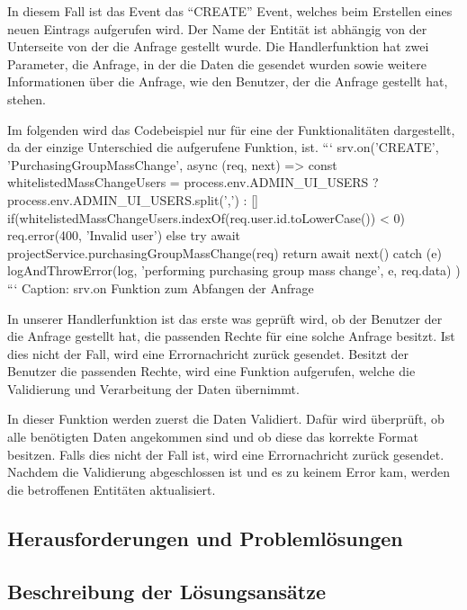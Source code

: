 In diesem Fall ist das Event das “CREATE” Event, welches beim Erstellen eines neuen Eintrags aufgerufen wird. Der Name der Entität ist abhängig von der Unterseite von der die Anfrage gestellt wurde. Die Handlerfunktion hat zwei Parameter, die Anfrage, in der die Daten die gesendet wurden sowie weitere Informationen über die Anfrage, wie den Benutzer, der die Anfrage gestellt hat, stehen.

Im folgenden wird das Codebeispiel nur für eine der Funktionalitäten dargestellt, da der einzige Unterschied die aufgerufene Funktion, ist.
```
srv.on('CREATE', 'PurchasingGroupMassChange', async (req, next) => {
        const whitelistedMassChangeUsers = process.env.ADMIN_UI_USERS ? process.env.ADMIN_UI_USERS.split(',') : []
        if(whitelistedMassChangeUsers.indexOf(req.user.id.toLowerCase()) < 0) {
            req.error(400, 'Invalid user')
        } else {
            try {
                await projectService.purchasingGroupMassChange(req)
                return await next()
            } catch (e) {
                logAndThrowError(log, 'performing purchasing group mass change', e, req.data)
            }
        }
    })
```
Caption: srv.on Funktion zum Abfangen der Anfrage

In unserer Handlerfunktion ist das erste was geprüft wird, ob der Benutzer der die Anfrage gestellt hat, die passenden Rechte für eine solche Anfrage besitzt. Ist dies nicht der Fall, wird eine Errornachricht zurück gesendet. Besitzt der Benutzer die passenden Rechte, wird eine Funktion aufgerufen, welche die Validierung und Verarbeitung der Daten übernimmt.

In dieser Funktion werden zuerst die Daten Validiert. Dafür wird überprüft, ob alle benötigten Daten angekommen sind und ob diese das korrekte Format besitzen. Falls dies nicht der Fall ist, wird eine Errornachricht zurück gesendet. Nachdem die Validierung abgeschlossen ist und es zu keinem Error kam, werden die betroffenen Entitäten aktualisiert. 




\subsection[Herausforderungen und Problemlösungen]{Herausforderungen und Problemlösungen}

\subsection[Beschreibung der Lösungsansätze]{Beschreibung der Lösungsansätze}
